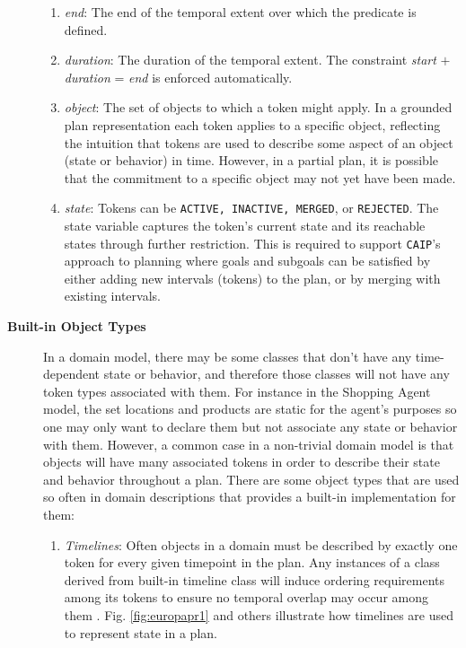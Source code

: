 \begin{description}
\begin{enumerate}
  \item \textit {end}: The end of the temporal extent over which the
    predicate is defined.

  \item \textit {duration}: The duration of the temporal extent. The
    constraint \textit{start} $+$ \textit{duration} = \textit{end} is
    enforced automatically.

  \item \textit{object}: The set of objects to which a token might
    apply. In a grounded plan representation each token applies to a
    specific object, reflecting the intuition that tokens are used to
    describe some aspect of an object (\ie state or behavior) in
    time. However, in a partial plan, it is possible that the
    commitment to a specific object may not yet have been made.

  \item \textit{state}: Tokens can be \texttt{ACTIVE, INACTIVE,
      MERGED}, or \texttt{REJECTED}. The state variable captures the
    token's current state and its reachable states through further
    restriction.  This is required to support \texttt{CAIP}'s approach
    to planning where goals and subgoals can be satisfied by either
    adding new intervals (tokens) to the plan, or by merging with
    existing intervals.
    
  \end{enumerate}

\item[\textbf{Built-in Object Types}] In a domain model, there may be
  some classes that don't have any time-dependent state or behavior,
  and therefore those classes will not have any token types associated
  with them. For instance in the Shopping Agent model, the set
  locations and products are static for the agent's purposes so one
  may only want to declare them but not associate any state or
  behavior with them.  However, a common case in a non-trivial domain
  model is that objects will have many associated tokens in order to
  describe their state and behavior throughout a plan. There are some
  object types that are used so often in domain descriptions that \eu
  provides a built-in implementation for them:

\begin{enumerate}

\item \textit{Timelines}: Often objects in a domain must be described
  by exactly one token for every given timepoint in the plan. Any
  instances of a class derived from \eus built-in timeline class will
  induce ordering requirements among its tokens to ensure no temporal
  overlap may occur among them \cite{mus94}. Fig. \ref{fig:europapr1}
  and others  illustrate how timelines are
  used to represent state in a plan.


\end{enumerate}
\end{description}

